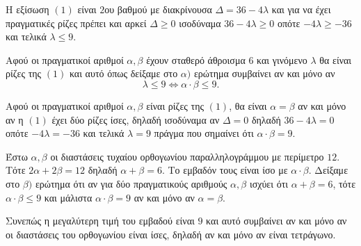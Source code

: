 
\begin{alist}
\item Η εξίσωση $(1)$ είναι $2$ου βαθμού με διακρίνουσα $\Delta = 36 - 4\lambda$ και για να έχει πραγματικές ρίζες πρέπει και αρκεί $\Delta \ge 0$ ισοδύναμα $36 - 4\lambda \ge 0$ οπότε $-4\lambda \ge -36$ και τελικά $\lambda \le 9$.

\item 
\begin{rlist}
\item Αφού οι πραγματικοί αριθμοί $\alpha, \beta$ έχουν σταθερό άθροισμα $6$ και γινόμενο $\lambda$ θα
είναι ρίζες της $(1)$ και αυτό όπως δείξαμε στο $\alpha)$ ερώτημα συμβαίνει αν και μόνο αν
\[\lambda \le 9 \Leftrightarrow \alpha \cdot \beta \le 9.\]
\item Αφού οι πραγματικοί αριθμοί $\alpha, \beta$ είναι ρίζες της $(1)$, θα είναι $\alpha = \beta$ αν και μόνο αν
η $(1)$ έχει δύο ρίζες ίσες, δηλαδή ισοδύναμα αν $\Delta = 0$ δηλαδή $36 - 4\lambda = 0$ οπότε
$-4\lambda = -36$ και τελικά $\lambda = 9$ πράγμα που σημαίνει ότι $\alpha \cdot \beta = 9$.
\end{rlist}

\item Έστω $\alpha, \beta$ οι διαστάσεις τυχαίου ορθογωνίου παραλληλογράμμου με περίμετρο $12$.
Τότε $2\alpha + 2\beta = 12$ δηλαδή $\alpha + \beta = 6$. Το εμβαδόν τους είναι ίσο με $\alpha \cdot \beta$.
Δείξαμε στο $\beta)$ ερώτημα ότι αν για δύο πραγματικούς αριθμούς $\alpha, \beta$ ισχύει ότι $\alpha + \beta = 6$,
τότε $\alpha \cdot \beta \le 9$ και μάλιστα $\alpha \cdot \beta = 9$ αν και μόνο αν $\alpha = \beta$.

Συνεπώς η μεγαλύτερη τιμή του εμβαδού είναι $9$ και αυτό συμβαίνει αν και μόνο αν οι
διαστάσεις του ορθογωνίου είναι ίσες, δηλαδή αν και μόνο αν είναι τετράγωνο.
\end{alist}


